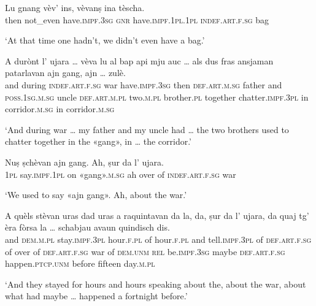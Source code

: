 \begin{linenumbers}
\gll    Lu gnang vèv’ ins, vèvanṣ ina tèscha.\\
then not\_even have.\textsc{impf.3sg} \textsc{gnr} have.\textsc{impf.1pl.1pl} \textsc{indef.art.f.sg} bag  \\
\end{linenumbers}
\medskip
\glt `At that time one hadn’t, we didn’t even have a bag.'
\medskip

\begin{linenumbers}
\gll    A durònt l’ ujara … vèva lu al bap api mju auc … als dus fras ansjaman patarlavan ajn gang, ajn … zulè.\footnotemark \\
and during \textsc{indef.art.f.sg} war {} have.\textsc{impf.3sg} then \textsc{def.art.m.sg} father and \textsc{poss.1sg.m.sg} uncle {} \textsc{def.art.m.pl} two.\textsc{m.pl} brother.\textsc{pl} together chatter.\textsc{impf.3pl} in corridor.\textsc{m.sg} in {} corridor.\textsc{m.sg} \\
\end{linenumbers}
\medskip
\glt `And during war … my father and my uncle had … the two brothers used to chatter together in the «gang», in … the corridor.' 
\medskip

\begin{linenumbers}
\gll    Nuṣ ṣchèvan ajn gang. Ah, ṣur da l’ ujara.\\
 \textsc{1pl} say.\textsc{impf.1pl} on «gang».\textsc{m.sg} ah over of \textsc{indef.art.f.sg} war \\
\end{linenumbers}
\medskip
\glt `We used to say «ajn gang». Ah, about the war.'
\medskip

\begin{linenumbers}
\gll    A quèls stèvan uras dad uras a raquintavan da la, da, ṣur da l’ ujara, da quaj tg’ èra fòrsa la … schabjau avaun quindisch dis.\\
and \textsc{dem.m.pl} stay.\textsc{impf.3pl} hour.\textsc{f.pl} of hour.\textsc{f.pl} and tell.\textsc{impf.3pl} of \textsc{def.art.f.sg} of over of \textsc{def.art.f.sg} war of \textsc{dem.unm} \textsc{rel} be.\textsc{impf.3sg} maybe \textsc{def.art.f.sg} {} happen.\textsc{ptcp.unm} before fifteen day.\textsc{m.pl}\\
\end{linenumbers}
\medskip
\glt `And they stayed for hours and hours speaking about the, about the war, about what had maybe … happened a fortnight before.'
\medskip

